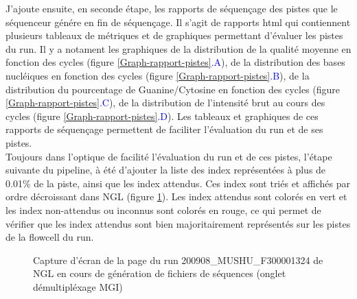 J'ajoute ensuite, en seconde étape, les rapports de séquençage des pistes que le séquenceur génére en fin de séquençage.
Il s'agit de rapports html qui contiennent plusieurs tableaux de métriques et de graphiques permettant d'évaluer les pistes du run.
Il y a notament les graphiques de la distribution de la qualité moyenne en fonction des cycles (figure \ref{Graph-rapport-pistes}\textcolor{blue}{.A}), de la distribution des bases nucléiques en fonction des cycles (figure \ref{Graph-rapport-pistes}\textcolor{blue}{.B}), de la distribution du pourcentage de Guanine/Cytosine en fonction des cycles (figure \ref{Graph-rapport-pistes}\textcolor{blue}{.C}), de la distribution de l'intensité brut au cours des cycles (figure \ref{Graph-rapport-pistes}\textcolor{blue}{.D}).
Les tableaux et graphiques de ces rapports de séquençage permettent de faciliter l'évaluation du run et de ses pistes.\\

Toujours dans l'optique de facilité l'évaluation du run et de ces pistes, l'étape suivante du pipeline, à été  d'ajouter la liste des index représentées à plus de 0.01\% de la piste, ainsi que les index attendus.
Ces index sont triés et affichés par ordre décroissant dans NGL (figure \ref{top-index}).
Les index attendus sont colorés en vert et les index non-attendus ou inconnus sont colorés en rouge, ce qui permet de vérifier que les index attendus sont bien majoritairement représentés sur les pistes de la flowcell du run.

\begin{figure}[H]
    \centering
    \caption{\footnotesize{Capture d'écran de la page du run 200908\_MUSHU\_F300001324 de NGL en cours de génération de fichiers de séquences (onglet \og démultipléxage MGI\fg{})}}
    \label{top-index}
\end{figure}

